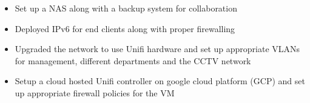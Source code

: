\begin{itemize}
    \item Set up a NAS along with a backup system for collaboration
    \item Deployed IPv6 for end clients along with proper firewalling
    \item Upgraded the network to use Unifi hardware
    and set up appropriate VLANs for management, different departments and the CCTV network
    \item Setup a cloud hosted Unifi controller on google cloud platform (GCP) and set up appropriate firewall policies for the VM
\end{itemize}
